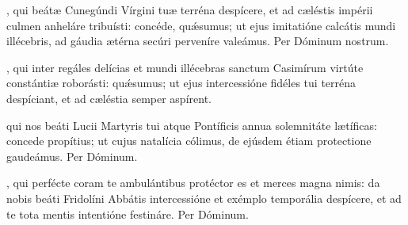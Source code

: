 \documentclass[fontsize=9pt,paper=A6,twoside,BCOR=1mm,DIV=22,headinclude]{scrarticle}
\begin{document}
\begin{multicols}{2}
{\RVVvi 




\VRVii 

\BV 

, qui beátæ Cunegúndi Vírgini tuæ terréna despícere, et ad cæléstis impérii culmen anheláre tribuísti: concéde, qu\'æsumus; ut ejus imitatióne calcátis mundi illécebris, ad gáudia ætérna secúri perveníre valeámus. Per Dóminum nostrum.



\VRVii 

\MiiV 


\AiC 

\VRCi 

, qui inter regáles delícias et mundi illécebras sanctum Casimírum virtúte constántiæ roborásti: quǽsumus; ut ejus intercessióne fidéles tui terréna despíciant, et ad cæléstia semper aspírent.

}

{

\AiM 

\VRMi 

 qui nos beáti Lucii Martyris tui atque Pontíficis annua solemnitáte lætíficas: concede propítius; ut cujus natalícia cólimus, de ejúsdem étiam protectione gaudeámus. Per Dóminum.

}


{

\VRCi 

\MiC 

, qui perfécte coram te ambulántibus protéctor es et merces magna nimis: da nobis beáti Fridolíni Abbátis intercessióne et exémplo temporália despícere, et ad te tota mentis intentióne festináre. Per Dóminum.

}



\end{multicols}
\end{document}

